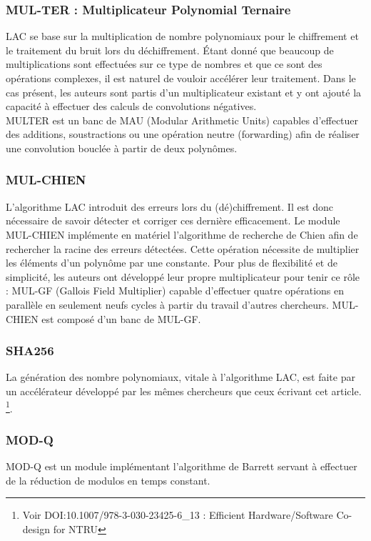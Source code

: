 \documentclass[10pt,a4paper]{article}
\begin{document}
\subsubsection{MUL-TER : Multiplicateur Polynomial Ternaire}
LAC se base sur la multiplication de nombre polynomiaux pour le chiffrement et le traitement du bruit lors du déchiffrement. Étant donné que beaucoup de multiplications sont effectuées 
sur ce type de nombres et que ce sont des opérations complexes, il est naturel de vouloir accélérer leur traitement. Dans le cas présent, les auteurs sont partis d'un multiplicateur existant et y ont 
ajouté la capacité à effectuer des calculs de convolutions négatives. \\
MULTER est un banc de MAU (Modular Arithmetic Units) capables d'effectuer des additions, soustractions ou une opération neutre (forwarding) afin de réaliser une convolution bouclée à partir de deux polynômes.

\subsubsection{MUL-CHIEN}
L'algorithme LAC introduit des erreurs lors du (dé)chiffrement. Il est donc nécessaire de savoir détecter et corriger ces dernière efficacement. Le module MUL-CHIEN implémente en matériel 
l'algorithme de recherche de Chien afin de rechercher la racine des erreurs détectées. Cette opération nécessite de multiplier les éléments d'un polynôme par une constante. Pour plus de flexibilité et 
de simplicité, les auteurs ont développé leur propre multiplicateur pour tenir ce rôle : MUL-GF (Gallois Field Multiplier) capable d'effectuer quatre opérations en parallèle en seulement neufs cycles à partir du travail 
d'autres chercheurs. MUL-CHIEN est composé d'un banc de MUL-GF.

\subsubsection{SHA256}
La génération des nombre polynomiaux, vitale à l'algorithme LAC, est faite par un accélérateur développé par les mêmes chercheurs que ceux écrivant cet article. 
\footnote{Voir DOI:10.1007/978-3-030-23425-6\_13 : Efficient Hardware/Software Co-design for NTRU}.
\subsubsection{MOD-Q}
MOD-Q est un module implémentant l'algorithme de Barrett servant à effectuer de la réduction de modulos en temps constant. 
\end{document}
